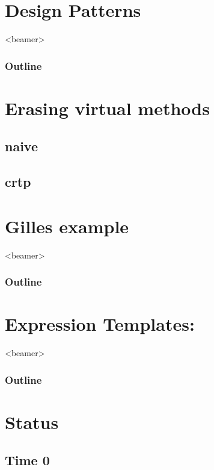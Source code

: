 \documentclass[notes=hide,xcolor=svgnames,professionalfonts,lualatex]{beamer}
\begin{document}
\section{Design Patterns}
\begin{frame}<beamer>                                                                                                                    
    \frametitle{Outline}
    \tableofcontents[currentsection]
\end{frame}


\section{Erasing virtual methods}
\subsection{naive}

\subsection{crtp}


\section{Gilles example}
\begin{frame}<beamer>                                                                                                                    
    \frametitle{Outline}
    \tableofcontents[currentsection]
\end{frame}


\section{Expression Templates:}
\begin{frame}<beamer>                                                                                                                    
    \frametitle{Outline}
    \tableofcontents[currentsection]
\end{frame}


\section{Status}
\subsection{Time 0}

\end{document}
